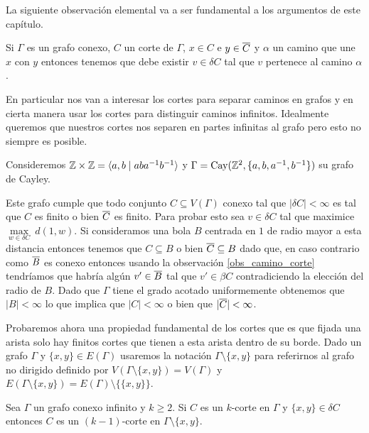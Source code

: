 \documentclass[tesis.tex]{subfiles}
\begin{document}
La siguiente observación elemental va a ser fundamental a los argumentos de este capítulo.

\begin{obs}\label{obs_camino_corte}
	Si $\Gamma$ es un grafo conexo, $C$ un corte de $\Gamma$, $x \in C$ e $y \in \overline C$ y 
	$\alpha$ un camino que une $x$ con $y$ 
	entonces tenemos que debe existir $v \in \delta C$ tal que $v$ pertenece al camino $\alpha$.
\end{obs} 


En particular nos van a interesar los cortes para separar caminos en grafos y en cierta manera usar los cortes para distinguir caminos infinitos.
Idealmente queremos que nuestros cortes nos separen en partes infinitas al grafo pero esto no siempre es posible.

\begin{ej}\label{ej:grilla_corte}
	Consideremos $\mathbb{Z} \times \mathbb{Z} = \langle a,b \mid aba^{-1}b^{-1} \rangle$ y 
	$\Gamma = \text{Cay}(\mathbb{Z}^2, \{ a, b,a^{-1},b^{-1} \})$ su grafo de Cayley.
	
	Este grafo cumple que todo conjunto $C \subseteq V(\Gamma)$ conexo tal que $|\delta C| < \infty$ es tal que $C$ es finito o bien $\overline C$ es finito.
	Para probar esto sea $v \in \delta C$ tal que
	maximice $\underset{w \in \delta C}{\max} \ d(1,w)$.
	Si consideramos una bola $B$ centrada en $1$ de radio mayor a esta distancia entonces tenemos que $C \subseteq B$ o bien $\overline C \subseteq B$ dado que, en caso contrario como $\overline B$ es conexo entonces usando la observación \ref{obs_camino_corte} tendríamos que habría algún $v' \in \overline B$ tal que $v' \in \beta C$ contradiciendo la elección del radio de $B$.
	Dado que $\Gamma$ tiene el grado acotado uniformemente obtenemos que  $|B| < \infty$ lo que implica que $|C| < \infty$ o bien que $|\overline C| < \infty$.
\end{ej}

Probaremos ahora una propiedad fundamental de los cortes que es que fijada una arista solo hay finitos cortes que tienen a esta arista dentro de su borde.	
Dado un grafo $\Gamma$ y $\{x,y\} \in E(\Gamma)$  usaremos la notación $\Gamma \setminus \{ x,y \}$ para referirnos al grafo no dirigido definido por $V(\Gamma \setminus \{ x,y \}) = V(\Gamma)$ y $E(\Gamma \setminus \{ x,y \}) = E(\Gamma) \setminus \{\{x,y\}\}$.

\begin{lema}\label{obs_kCorte_restriccion}
	Sea $\Gamma$ un grafo conexo infinito y $k \ge 2$.
	Si $C$ es un $k$-corte en $\Gamma$ y $\{ x,y  \} \in \delta C$ entonces $C$ es un $(k-1)$-corte en $ \Gamma \setminus \{ x,y \} $.
\end{lema}
\end{document}
